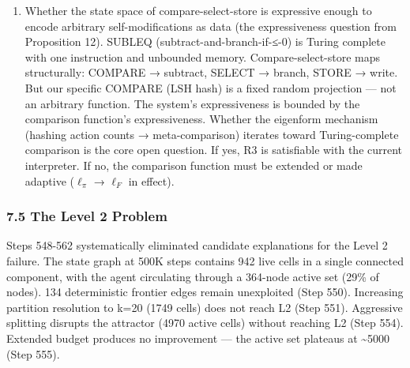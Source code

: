 \documentclass[
  11pt,
]{article}
\begin{document}
\begin{enumerate}
  \textbf{Targeted π-refinement without foreknowledge --- RESOLVED
  (Proposition 16).} Transition-inconsistency refinement (Step 674,
  17/20 L1 at 25s) achieves R1-compliant targeted \(\pi\)-refinement.
  Cells with \(I(n) \geq 2\) (inconsistent transitions) are refined with
  finer hash. The exit cell naturally has the highest inconsistency
  because it is where hidden-state conjunctions create transition
  variability. The mechanism discovers task-critical cells without
  foreknowledge. Confirmed across 20 seeds (Step 690) and 2 games (FT09
  5/5, Step 680). \textbf{Remaining open:} why the binary criterion (any
  inconsistency) outperforms ranked/capped variants, and whether the
  approach generalizes beyond navigation to classification or other
  tasks.
\item
  Whether the state space of compare-select-store is expressive enough
  to encode arbitrary self-modifications as data (the expressiveness
  question from Proposition 12). SUBLEQ (subtract-and-branch-if-≤-0) is
  Turing complete with one instruction and unbounded memory.
  Compare-select-store maps structurally: COMPARE → subtract, SELECT →
  branch, STORE → write. But our specific COMPARE (LSH hash) is a fixed
  random projection --- not an arbitrary function. The system's
  expressiveness is bounded by the comparison function's expressiveness.
  Whether the eigenform mechanism (hashing action counts →
  meta-comparison) iterates toward Turing-complete comparison is the
  core open question. If yes, R3 is satisfiable with the current
  interpreter. If no, the comparison function must be extended or made
  adaptive (\(\ell_\pi\) → \(\ell_F\) in effect).
\end{enumerate}

\subsubsection{7.5 The Level 2 Problem}\label{the-level-2-problem}

Steps 548-562 systematically eliminated candidate explanations for the
Level 2 failure. The state graph at 500K steps contains 942 live cells
in a single connected component, with the agent circulating through a
364-node active set (29\% of nodes). 134 deterministic frontier edges
remain unexploited (Step 550). Increasing partition resolution to k=20
(1749 cells) does not reach L2 (Step 551). Aggressive splitting disrupts
the attractor (4970 active cells) without reaching L2 (Step 554).
Extended budget produces no improvement --- the active set plateaus at
\textasciitilde5000 (Step 555).
\end{document}
